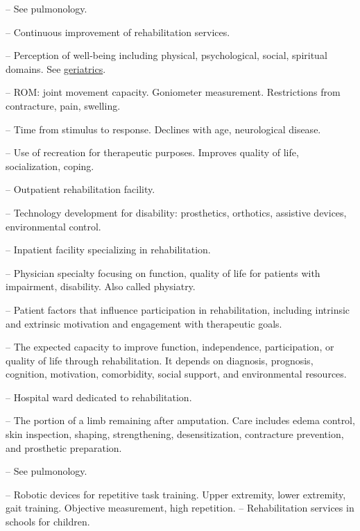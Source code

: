 -- See pulmonology.



-- Continuous improvement of rehabilitation services.

-- Perception of well-being including physical, psychological, social, spiritual domains. See \hyperlink{Geriatrics}{geriatrics}.

-- ROM: joint movement capacity. Goniometer measurement. Restrictions from contracture, pain, swelling.

-- Time from stimulus to response. Declines with age, neurological disease.

-- Use of recreation for therapeutic purposes. Improves quality of life, socialization, coping.

-- Outpatient rehabilitation facility.

-- Technology development for disability: prosthetics, orthotics, assistive devices, environmental control.

-- Inpatient facility specializing in rehabilitation.

-- Physician specialty focusing on function, quality of life for patients with impairment, disability. Also called physiatry.

-- Patient factors that influence participation in rehabilitation, including intrinsic and extrinsic motivation and engagement with therapeutic goals.


-- The expected capacity to improve function, independence, participation, or quality of life through rehabilitation. It depends on diagnosis, prognosis, cognition, motivation, comorbidity, social support, and environmental resources.

-- Hospital ward dedicated to rehabilitation.

-- The portion of a limb remaining after amputation. Care includes edema control, skin inspection, shaping, strengthening, desensitization, contracture prevention, and prosthetic preparation.

-- See pulmonology.

-- Robotic devices for repetitive task training. Upper extremity, lower extremity, gait training. Objective measurement, high repetition.
-- Rehabilitation services in schools for children.

